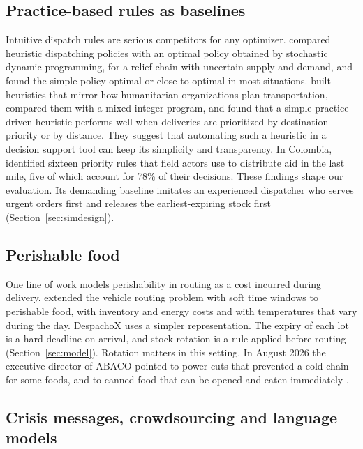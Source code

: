 \documentclass[11pt]{article}
\begin{document}
\subsection{Practice-based rules as baselines}

Intuitive dispatch rules are serious competitors for any optimizer. \citet{cook2017dispatching} compared heuristic dispatching policies with an optimal policy obtained by stochastic dynamic programming, for a relief chain with uncertain supply and demand, and found the simple policy optimal or close to optimal in most situations. \citet{gralla2018humanitarian} built heuristics that mirror how humanitarian organizations plan transportation, compared them with a mixed-integer program, and found that a simple practice-driven heuristic performs well when deliveries are prioritized by destination priority or by distance. They suggest that automating such a heuristic in a decision support tool can keep its simplicity and transparency. In Colombia, \citet{rueda2021coordinacion} identified sixteen priority rules that field actors use to distribute aid in the last mile, five of which account for 78\% of their decisions. These findings shape our evaluation. Its demanding baseline imitates an experienced dispatcher who serves urgent orders first and releases the earliest-expiring stock first (Section~\ref{sec:simdesign}).

\subsection{Perishable food}

One line of work models perishability in routing as a cost incurred during delivery. \citet{hsu2007vehicle} extended the vehicle routing problem with soft time windows to perishable food, with inventory and energy costs and with temperatures that vary during the day. DespachoX uses a simpler representation. The expiry of each lot is a hard deadline on arrival, and stock rotation is a rule applied before routing (Section~\ref{sec:model}). Rotation matters in this setting. In August 2026 the executive director of ABACO pointed to power cuts that prevented a cold chain for some foods, and to canned food that can be opened and eaten immediately \citep{larepublica2026abaco}.

\subsection{Crisis messages, crowdsourcing and language models}
\end{document}
